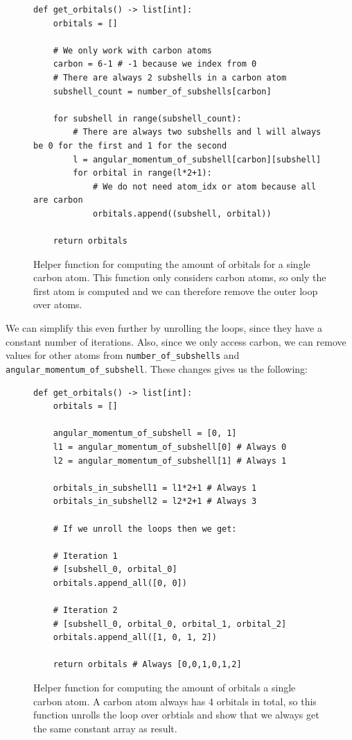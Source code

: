 \begin{figure}[H]
\begin{verbatim}
def get_orbitals() -> list[int]:
    orbitals = []

    # We only work with carbon atoms
    carbon = 6-1 # -1 because we index from 0
    # There are always 2 subshells in a carbon atom
    subshell_count = number_of_subshells[carbon]

    for subshell in range(subshell_count):
        # There are always two subshells and l will always be 0 for the first and 1 for the second
        l = angular_momentum_of_subshell[carbon][subshell]
        for orbital in range(l*2+1):
            # We do not need atom_idx or atom because all are carbon
            orbitals.append((subshell, orbital))

    return orbitals
\end{verbatim}
\caption{Helper function for computing the amount of orbitals for a single carbon atom. This function only considers carbon atoms, so only the first atom is computed and we can therefore remove the outer loop over atoms.}
\end{figure}

We can simplify this even further by unrolling the loops, since they have a constant number of iterations. Also, since we only access carbon, we can remove values for other atoms from \verb|number_of_subshells| and \verb|angular_momentum_of_subshell|. These changes gives us the following:

\begin{figure}[H]
\begin{verbatim}
def get_orbitals() -> list[int]:
    orbitals = []

    angular_momentum_of_subshell = [0, 1]
    l1 = angular_momentum_of_subshell[0] # Always 0
    l2 = angular_momentum_of_subshell[1] # Always 1

    orbitals_in_subshell1 = l1*2+1 # Always 1
    orbitals_in_subshell2 = l2*2+1 # Always 3

    # If we unroll the loops then we get:

    # Iteration 1
    # [subshell_0, orbital_0]
    orbitals.append_all([0, 0])

    # Iteration 2
    # [subshell_0, orbital_0, orbital_1, orbital_2]
    orbitals.append_all([1, 0, 1, 2])

    return orbitals # Always [0,0,1,0,1,2]
\end{verbatim}
\caption{Helper function for computing the amount of orbitals a single carbon atom. A carbon atom always has 4 orbitals in total, so this function unrolls the loop over orbtials and show that we always get the same constant array as result.}
\end{figure}

